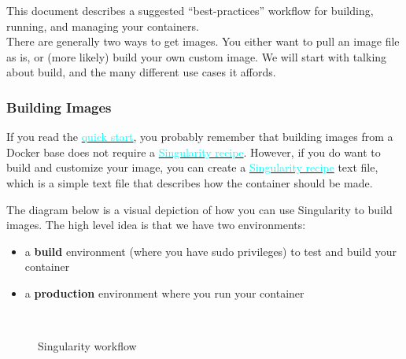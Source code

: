 \documentclass[a4paper]{article}
\newcounter{subsubsubsection}[subsubsection]
\begin{document}
This document describes a suggested “best-practices” workflow for building, running, and managing your containers.\\[0.1in]
There are generally two ways to get images. You either want to pull an image file as is, or (more likely) build your own custom image. We will start with talking about build, and the many different use cases it affords.


\label{sec:singularityflow}
\subsubsection{Building Images}

If you read the \hyperref[sec:quickstart]{{\textcolor{cyan}{quick start}}}, you probably remember that building images from a Docker base does not require a \hyperref[sec:recipefile]{{\textcolor{cyan}{Singularity recipe}}}. However, if you do want to build and customize your image, you can create a \hyperref[sec:recipefile]{{\textcolor{cyan}{Singularity recipe}}} text file, which is a simple text file that describes how the container should be made.\\[0.1in]


	The diagram below is a visual depiction of how you can use Singularity to build images. The high level idea is that we have two environments:
	
	\begin{itemize}
	\item a \textbf{build} environment (where you have sudo privileges) to test and build your container
	\item a \textbf{production} environment where you run your container
\end{itemize}

\begin{figure}[h]
\centering
{\includegraphics[width=0.5,height=0.5]{flow.png}}
\caption{Singularity workflow}
\end{figure}
\end{document}
